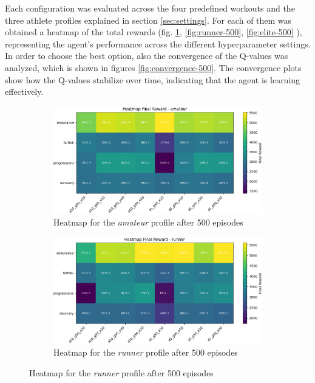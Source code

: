Each configuration was evaluated across the four predefined workouts and the three athlete profiles explained in section \ref{sec:settings}. For each of them was obtained a heatmap of the total rewards (fig. \ref{fig:amateur-500}, \ref{fig:runner-500}, \ref{fig:elite-500} ), representing the agent's performance across the different hyperparameter settings. 
In order to choose the best option, also the convergence of the Q-values was analyzed, which is shown in figures \ref{fig:convergence-500}. The convergence plots show how the Q-values stabilize over time, indicating that the agent is learning effectively.
\begin{figure}[!htbp]
    \centering
    \begin{subfigure}[t]{0.90\textwidth}
        \centering
        \includegraphics[width=\textwidth]{images/heatmap_final_amatour_500.png}
      \caption{Heatmap for the \textit{amateur} profile after 500 episodes}
    \label{fig:amateur-500}
    \end{subfigure}
    \begin{subfigure}[t]{0.90\textwidth}
        \centering
        \includegraphics[width=\textwidth]{images/heatmap_final_runner_500.png}
        \caption{Heatmap for the \textit{runner} profile after 500 episodes}

\end{subfigure}
\end{figure}

